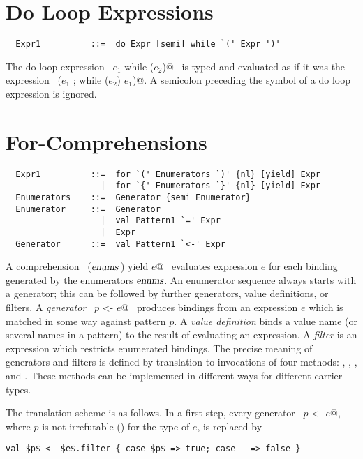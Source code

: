 \section{Do Loop Expressions}

\syntax\begin{lstlisting}
  Expr1          ::=  do Expr [semi] while `(' Expr ')'
\end{lstlisting}

The do loop expression ~\lstinline@do $e_1$ while ($e_2$)@~ is typed and
evaluated as if it was the expression ~\lstinline@($e_1$ ; while ($e_2$) $e_1$)@.
A semicolon preceding the  symbol of a do loop expression is ignored.

\section{For-Comprehensions}\label{sec:for-comprehensions}

\syntax\begin{lstlisting}
  Expr1          ::=  for `(' Enumerators `)' {nl} [yield] Expr
                   |  for `{' Enumerators `}' {nl} [yield] Expr
  Enumerators    ::=  Generator {semi Enumerator}
  Enumerator     ::=  Generator 
                   |  val Pattern1 `=' Expr 
                   |  Expr
  Generator      ::=  val Pattern1 `<-' Expr
\end{lstlisting}

A comprehension ~\lstinline@for ($\mbox{\sl enums}\,$) yield $e$@~ evaluates
expression $e$ for each binding generated by the enumerators
$\mbox{\sl enums}$. An enumerator sequence always starts with a generator; this
can be followed by further generators, value definitions, or filters.
A {\em generator} ~\lstinline@val $p$ <- $e$@~ produces bindings from
an expression $e$ which is matched in some way against pattern $p$. A
{\em value definition} binds a value name (or several names in a
pattern) to the result of evaluating an expression. A {\em filter} is
an expression which restricts enumerated bindings. The precise meaning
of generators and filters is defined by translation to invocations of
four methods: , , , and
. These methods can be implemented in different ways for
different carrier types.  

The translation scheme is as follows.  In a first step, every
generator ~\lstinline@val $p$ <- $e$@, where $p$ is not irrefutable ()
for the type of $e$, is replaced by
\begin{lstlisting}
val $p$ <- $e$.filter { case $p$ => true; case _ => false }
\end{lstlisting}

